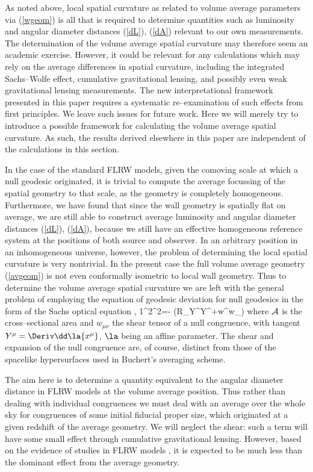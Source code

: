 \documentclass[12pt]{iopart}
\begin{document}
As noted above, local spatial curvature as related to volume average
parameters via (\ref{wgeom}) is all that is required to determine quantities
such as luminosity and angular diameter distances (\ref{dL}), (\ref{dA})
relevant to our own measurements. The determination of the volume average
spatial curvature may therefore seem an academic exercise. However, it could
be relevant for any calculations which may rely on the average differences in
spatial curvature, including the integrated Sachs--Wolfe effect, cumulative
gravitational lensing, and possibly even weak gravitational lensing
measurements. The new interpretational framework presented in this paper
requires a systematic re--examination of such effects from first principles.
We leave such issues for future work. Here we will merely try to introduce
a possible framework for calculating the volume average spatial curvature.
As such, the results derived elsewhere in this paper are independent of
the calculations in this section.

In the case of the standard FLRW models,
given the comoving scale at which a null geodesic originated,
it is trivial to compute the average focussing of the spatial geometry to that
scale, as the geometry is completely homogeneous. Furthermore, we have found
that since the wall geometry is spatially flat on average, we are still able
to construct average luminosity and angular diameter distances (\ref{dL}),
(\ref{dA}), because we still have an effective homogeneous reference system
at the positions of both source and observer. In an arbitrary position in an
inhomogeneous universe, however, the problem of determining the local
spatial curvature is very nontrivial. In the present case the full volume
average geometry (\ref{avgeom}) is not even conformally isometric to local
wall geometry. Thus to determine the volume average spatial curvature
we are left with the general problem of employing the equation of geodesic
deviation for null geodesics in the form of the Sachs optical equation
\cite{Peebles},
\beq
{1\over{}}{\dd^2\over\dd\la^2}=-\half
\left({\cal R}_{\mu\nu}Y^\mu Y^\nu+w^{\mu\nu}w_{\mu\nu}\right)
\label{sachs}\eeq
where $\cal A$ is the cross--sectional area and $w_{\mu\nu}$ the shear tensor
of a null congruence, with tangent $Y^\mu=\Deriv\dd\la{x^\mu}$,
$\la$ being an affine parameter. The shear and expansion of the null
congruence are, of course, distinct from those of the spacelike hypersurfaces
used in Buchert's averaging scheme.

The aim here is to determine a quantity equivalent to the angular diameter
distance in FLRW models at the volume average position. Thus rather than
dealing with individual congruences we must deal with an average over the
whole sky for congruences of some initial fiducial proper size, which
originated at a given redshift of the average geometry. We will neglect the
shear: such a term will have some small effect through cumulative
gravitational lensing. However, based on the evidence of studies
in FLRW models \cite{lensing1}, it is expected to be much less than
the dominant effect from the average geometry.
\end{document}

